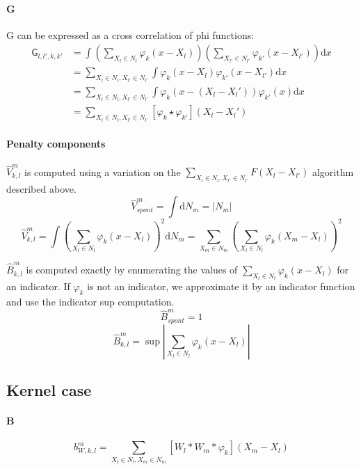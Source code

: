 \documentclass[a4paper,10pt]{article}
\newcommand\D{\mathrm{d}}
\newcommand\Convolution{\ast}
\newcommand\Correlation{\star}
\begin{document}
\paragraph{G}
G can be expressed as a cross correlation of phi functions:
\[ \begin{split}
    \mathsf{G}_{l,l',k,k'}
    & = \int \left( \sum_{X_l \in N_l} \varphi_k(x-X_l) \right) \left( \sum_{X_{l'} \in N_{l'}} \varphi_{k'}(x-X_{l'}) \right) \D x \\
    & = \sum_{X_l \in N_l, X_{l'} \in N_{l'}} \int \varphi_k(x-X_l) \varphi_{k'}(x-X_{l'}) \D x \\
    & = \sum_{X_l \in N_l, X_{l'} \in N_{l'}} \int \varphi_k(x-(X_l-X_l')) \varphi_{k'}(x) \D x \\
    & = \sum_{X_l \in N_l, X_{l'} \in N_{l'}} [\varphi_k \Correlation \varphi_{k'}] (X_l-X_l')
\end{split} \]

\paragraph{Penalty components}
$\widehat{V}_{k,l}^m$ is computed using a variation on the $\sum_{X_l \in N_l, X_{l'} \in N_{l'}} F(X_l-X_{l'})$ algorithm described above.
\[ \widehat{V}_{spont}^m = \int \D N_m = |N_m| \]
\[
    \widehat{V}_{k,l}^m =
    \int \left( \sum_{X_l \in N_l} \varphi_k(x-X_l) \right)^2 \D N_m =
    \sum_{X_m \in N_m} \left( \sum_{X_l \in N_l} \varphi_k(X_m-X_l) \right)^2
\]

$\widehat{B}_{k,l}^m$ is computed exactly by enumerating the values of $\sum_{X_l \in N_l} \varphi_k(x - X_l)$ for an indicator.
If $\varphi_k$ is not an indicator, we approximate it by an indicator function and use the indicator sup computation.
\[ \widehat{B}_{spont}^m = 1 \]
\[ \widehat{B}_{k,l}^m = \sup |\sum_{X_l \in N_l} \varphi_k(x - X_l)| \]

\subsection{Kernel case}

\paragraph{B}
\[ b_{W,k,l}^m = \sum_{X_l \in N_l, X_m \in N_m} [W_l \Convolution W_m \Convolution \varphi_k] (X_m - X_l) \]
\end{document}

